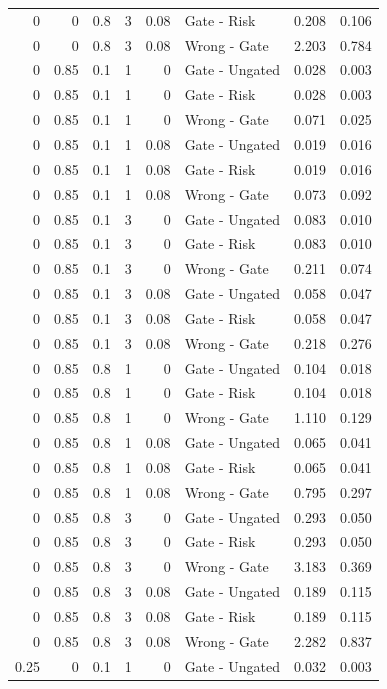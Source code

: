 \begin{longtable}{rrrrrlrr}
0 & 0 & 0.8 & 3 & 0.08 & Gate - Risk & 0.208 & 0.106\\
0 & 0 & 0.8 & 3 & 0.08 & Wrong - Gate & 2.203 & 0.784\\
0 & 0.85 & 0.1 & 1 & 0 & Gate - Ungated & 0.028 & 0.003\\
0 & 0.85 & 0.1 & 1 & 0 & Gate - Risk & 0.028 & 0.003\\
0 & 0.85 & 0.1 & 1 & 0 & Wrong - Gate & 0.071 & 0.025\\
0 & 0.85 & 0.1 & 1 & 0.08 & Gate - Ungated & 0.019 & 0.016\\
0 & 0.85 & 0.1 & 1 & 0.08 & Gate - Risk & 0.019 & 0.016\\
0 & 0.85 & 0.1 & 1 & 0.08 & Wrong - Gate & 0.073 & 0.092\\
0 & 0.85 & 0.1 & 3 & 0 & Gate - Ungated & 0.083 & 0.010\\
0 & 0.85 & 0.1 & 3 & 0 & Gate - Risk & 0.083 & 0.010\\
0 & 0.85 & 0.1 & 3 & 0 & Wrong - Gate & 0.211 & 0.074\\
0 & 0.85 & 0.1 & 3 & 0.08 & Gate - Ungated & 0.058 & 0.047\\
0 & 0.85 & 0.1 & 3 & 0.08 & Gate - Risk & 0.058 & 0.047\\
0 & 0.85 & 0.1 & 3 & 0.08 & Wrong - Gate & 0.218 & 0.276\\
0 & 0.85 & 0.8 & 1 & 0 & Gate - Ungated & 0.104 & 0.018\\
0 & 0.85 & 0.8 & 1 & 0 & Gate - Risk & 0.104 & 0.018\\
0 & 0.85 & 0.8 & 1 & 0 & Wrong - Gate & 1.110 & 0.129\\
0 & 0.85 & 0.8 & 1 & 0.08 & Gate - Ungated & 0.065 & 0.041\\
0 & 0.85 & 0.8 & 1 & 0.08 & Gate - Risk & 0.065 & 0.041\\
0 & 0.85 & 0.8 & 1 & 0.08 & Wrong - Gate & 0.795 & 0.297\\
0 & 0.85 & 0.8 & 3 & 0 & Gate - Ungated & 0.293 & 0.050\\
0 & 0.85 & 0.8 & 3 & 0 & Gate - Risk & 0.293 & 0.050\\
0 & 0.85 & 0.8 & 3 & 0 & Wrong - Gate & 3.183 & 0.369\\
0 & 0.85 & 0.8 & 3 & 0.08 & Gate - Ungated & 0.189 & 0.115\\
0 & 0.85 & 0.8 & 3 & 0.08 & Gate - Risk & 0.189 & 0.115\\
0 & 0.85 & 0.8 & 3 & 0.08 & Wrong - Gate & 2.282 & 0.837\\
0.25 & 0 & 0.1 & 1 & 0 & Gate - Ungated & 0.032 & 0.003\\

\end{longtable}
